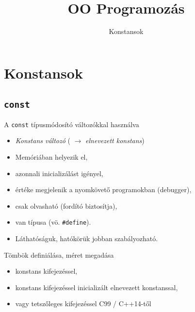 \documentclass[usenames,dvipsnames,aspectratio=169]{beamer}
\title[OO Programozás - C++]{OO Programozás}
\subtitle{Konstansok}
\begin{document}
\begin{frame}[plain]
  \titlepage
  \logoalul
\end{frame}

\section{Konstansok}

\subsection{\texttt{const}}

\begin{frame}
    A \texttt{const} típusmódosító változókkal használva
    \begin{itemize}
        \footnotesize
        \item \emph{Konstans változó} ( $\to$ \emph{elnevezett konstans})
        \item Memóriában helyezik el,
        \item azonnali inicializálást igényel, 
        \item értéke megjelenik a nyomkövető programokban (debugger),
        \item csak olvasható (fordító biztosítja),
        \item van típusa (vö. \texttt{\#define}).
        \item Láthatóságuk, hatókörük jobban szabályozható.
    \end{itemize}
    \vfill
    Tömbök definiálása, méret megadása
    \begin{itemize}
        \footnotesize
        \item konstans kifejezéssel,
        \item konstans kifejezéssel inicializált elnevezett konstanssal,
        \item vagy tetszőleges kifejezéssel C99 / C++14-től
    \end{itemize}
\end{frame}

\begin{frame}
    \begin{exampleblock}{}
        
    \end{exampleblock}
\end{frame}

\begin{frame}
    \begin{exampleblock}{}
        \small
        
    \end{exampleblock}
\end{frame}
\end{document}
